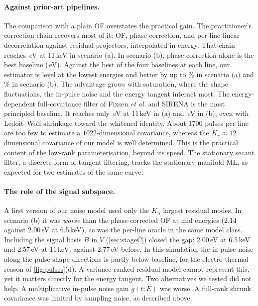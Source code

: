 \documentclass[aps,prapplied,reprint,superscriptaddress,longbibliography,nofootinbib]{revtex4-2}
\theoremstyle{remark}
\begin{document}
\paragraph{Against prior-art pipelines.} The comparison with a plain OF overstates
the practical gain. The practitioner's correction chain recovers most of it: OF,
phase correction, and per-line linear decorrelation against residual projectors,
interpolated in energy. That chain reaches \resPracticeHi\,eV at 11\,keV in
scenario (a). In scenario (b), phase correction alone is the best baseline
(\resPhaseHiNoMorph\,eV). Against the best of the four baselines at each line, our
estimator is level at the lowest energies and better by up to \impBestHi\% in
scenario (a) and \impBestHiNoMorph\% in scenario (b). The
advantage grows with saturation, where the shape fluctuations, the in-pulse noise
and the energy tangent interact most. The energy-dependent full-covariance filter
of Fixsen \emph{et al.} and SIRENA is the most principled baseline. It reaches only
\resCovarHi\,eV at 11\,keV in (a) and \resCovarHiNoMorph\,eV in (b), even with
Ledoit--Wolf shrinkage toward the whitened identity. About 1700 pulses per line are
too few to estimate a $1022$-dimensional covariance, whereas the $K_v\approx12$
dimensional covariance of our model is well determined. This is the practical
content of the low-rank parameterisation, beyond its speed. The stationary secant
filter, a discrete form of tangent filtering, tracks the stationary manifold ML, as
expected for two estimates of the same curve.

\paragraph{The role of the signal subspace.} A first version of our noise model used
only the $K_n$ largest residual modes. In scenario (b) it was \emph{worse} than the
phase-corrected OF at mid energies (2.14 against 2.00\,eV at 6.5\,keV), as was the
per-line oracle in the same model class. Including the signal basis $B$ in $V$
(\cref{sec:stageC}) closed the gap: 2.00\,eV at 6.5\,keV and 2.57\,eV at 11\,keV,
against 2.77\,eV before. In this simulation the in-pulse noise along the
pulse-shape directions is partly below baseline, for the electro-thermal reason of
\cref{fig:pulses}(d). A variance-ranked residual model cannot represent this, yet
it matters directly for the energy tangent. Two alternatives we tested did not
help. A multiplicative in-pulse noise gain $g(t;E)$ was worse. A full-rank shrunk
covariance was limited by sampling noise, as described above.
\end{document}
